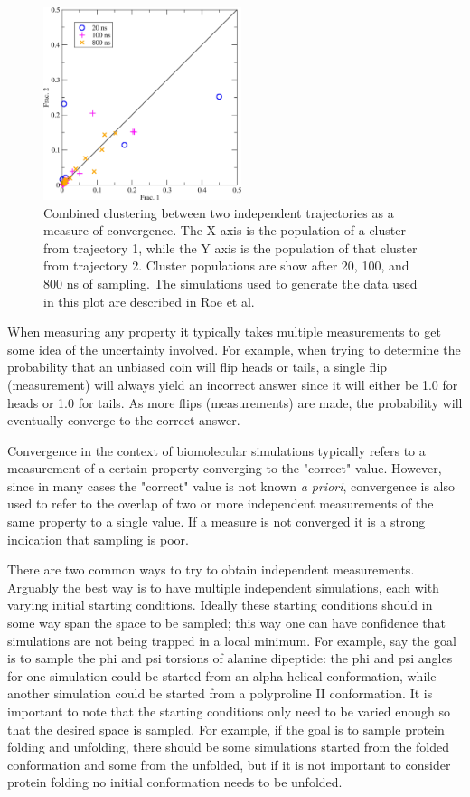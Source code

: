 \begin{figure}
  \includegraphics[width=5.8cm]{figures/combinedcluster}
  \caption{
  \label{f:combinedcluster} Combined clustering between two independent trajectories as a measure of convergence. The X axis is the population of a cluster from trajectory 1, while the Y axis is the population of that cluster from trajectory 2. Cluster populations are show after 20, 100, and 800 ns of sampling. The simulations used to generate the data used in this plot are described in Roe et al.\citep{Roe2014}
  }
\end{figure}

When measuring any property it typically takes multiple measurements to get some idea of the uncertainty involved. For example, when trying to determine the probability that an unbiased coin will flip heads or tails, a single flip (measurement) will always yield an incorrect answer since it will either be 1.0 for heads or 1.0 for tails. As more flips (measurements) are made, the probability will eventually converge to the correct answer. 

Convergence in the context of biomolecular simulations typically refers to a measurement of a certain property converging to the "correct" value. However, since in many cases the "correct" value is not known \emph{a priori}, convergence is also used to refer to the overlap of two or more independent measurements of the same property to a single value.
 If a measure is not converged it is a strong indication that sampling is poor. 
 
 There are two common ways to try to obtain independent measurements. Arguably the best way is to have multiple independent simulations, each with varying initial starting conditions. Ideally these starting conditions should in some way span the space to be sampled; this way one can have confidence that simulations are not being trapped in a local minimum. For example, say the goal is to sample the phi and psi torsions of alanine dipeptide: the phi and psi angles for one simulation could be started from an alpha-helical conformation, while another simulation could be started from a polyproline II conformation. It is important to note that the starting conditions only need to be varied enough so that the desired space is sampled. For example, if the goal is to sample protein folding and unfolding, there should be some simulations started from the folded conformation and some from the unfolded, but if it is not important to consider protein folding no initial conformation needs to be unfolded.

